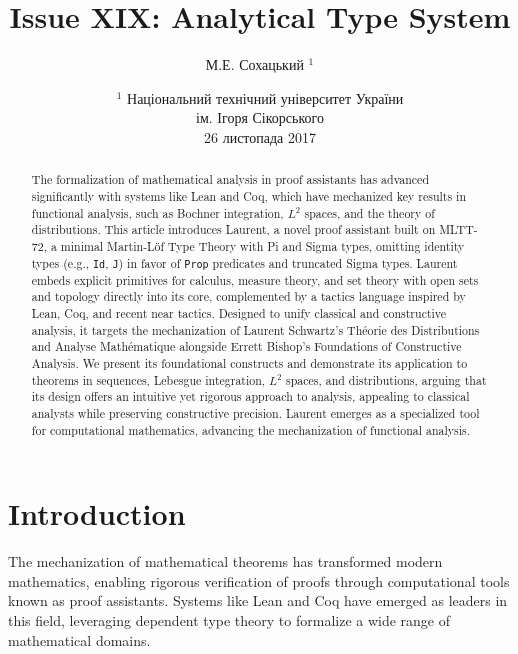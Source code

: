\documentclass{article}
\begin{document}
\author { М.Е. Сохацький $^1$ }
\title { Issue XIX: Analytical Type System }
\date{ \small $^1$ Національний технічний університет України \\
       ім. Ігоря Сікорського \\
       26 листопада 2017 }
\maketitle

\begin{abstract}

  The formalization of mathematical analysis in proof assistants has
  advanced significantly with systems like Lean and Coq, which have
  mechanized key results in functional analysis, such as Bochner
  integration, $L^2$ spaces, and the theory of distributions. This
  article introduces Laurent, a novel proof assistant built on MLTT-72,
  a minimal Martin-Löf Type Theory with Pi and Sigma types, omitting
  identity types (e.g., \texttt{Id}, \texttt{J}) in favor of
  \texttt{Prop} predicates and truncated Sigma types. Laurent
  embeds explicit primitives for calculus, measure theory, and set
  theory with open sets and topology directly into its core,
  complemented by a tactics language inspired by Lean, Coq, and
  recent near tactics. Designed to unify classical and constructive
  analysis, it targets the mechanization of Laurent Schwartz’s Théorie
  des Distributions and Analyse Mathématique alongside Errett Bishop’s
  Foundations of Constructive Analysis. We present its foundational
  constructs and demonstrate its application to theorems in sequences,
  Lebesgue integration, $L^2$ spaces, and distributions, arguing that
  its design offers an intuitive yet rigorous approach to analysis,
  appealing to classical analysts while preserving constructive
  precision. Laurent emerges as a specialized tool for computational
  mathematics, advancing the mechanization of functional analysis.

\end{abstract}


\tableofcontents
\newpage

\section{Introduction}
The mechanization of mathematical theorems has transformed modern mathematics,
enabling rigorous verification of proofs through computational tools known as
proof assistants. Systems like Lean and Coq have emerged as leaders in this field,
leveraging dependent type theory to formalize a wide range of mathematical domains.
\end{document}
